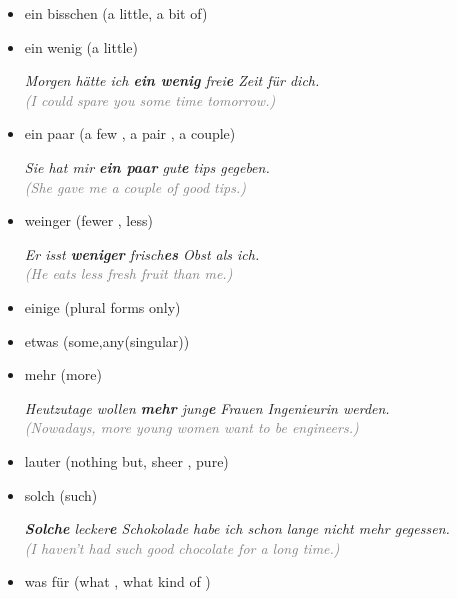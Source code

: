 \documentclass[a4paper,twocolumn,10pt]{article}
\newcommand{\newpar}
{\par \vspace{0.3cm}}
\begin{document}

\begin{itemize}[noitemsep]
	\item ein bisschen (a little, a bit of)

	\item ein wenig (a little)

		\textit{Morgen hätte ich \textbf{ein wenig}
			frei\textbf{\textcolor{green-goethe}{e}} Zeit für dich.}\\
		\textcolor{gray} { \textit{(I could spare you some time tomorrow.)} }
		\newpar

	\item ein paar (a few , a pair , a couple)

		\textit{Sie hat mir \textbf{ein paar}
			gut\textbf{\textcolor{green-goethe}{e}} tips gegeben.}\\
		\textcolor{gray} { \textit{(She gave me a couple of good tips.)} }
		\newpar


	\item weinger (fewer , less) 

		\textit{Er isst \textbf{weniger}
			frisch\textbf{\textcolor{green-goethe}{es}} Obst als ich.}\\
		\textcolor{gray} { \textit{(He eats less fresh fruit than me.)} }
		\newpar


	\item einige (plural forms only)

	\item etwas (some,any(singular))

	\item mehr (more)

		\textit{Heutzutage wollen \textbf{mehr}
			jung\textbf{\textcolor{green-goethe}{e}} Frauen Ingenieurin werden.}\\
		\textcolor{gray} { \textit{(Nowadays, more young women want to be
				engineers.)} }
		\newpar


	\item lauter (nothing but, sheer , pure)

	\item solch (such)

		\textit{\textbf{Solche} lecker\textbf{\textcolor{green-goethe}{e}}
			Schokolade habe ich schon lange nicht mehr gegessen.}\\
		\textcolor{gray} { \textit{(I haven't had such good chocolate for a long
				time.)} } \newpar

	\item was für (what , what kind of )


\end{itemize}
\end{document}
